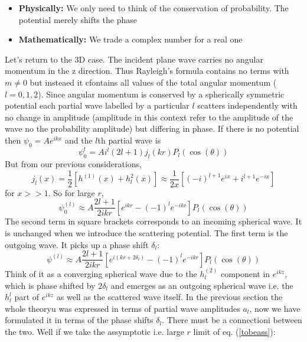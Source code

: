 \begin{itemize}
\item \textbf{Physically:} We only need to think of the conservation of probability. The potential merely shifts the phase
\item \textbf{Mathematically:} We trade a complex number for a real one
\end{itemize}
Let's return to the 3D  case. The incident plane wave carries no angular momentum in the z direction. Thus Rayleigh's formula contains no terms with $m \neq 0$ but insteaed it cfontains all values of the total angular momentum ($l = 0, 1, 2$). Since angular momentum is conserved by a spherically symmetric potential each partial wave labelled by a particular $l$ scatters independently with no change in amplitude (amplitude in this context refer to the amplitude of the wave no the probability amplitude) but differing in phase. If there is no potential then $\psi_{0} = A e^{ikx}$ and the $l$th partial wave is
\begin{equation}
\psi^{l}_{0} = A i^{l} (2l +1) j_{l}(kr)P_{l}(\cos(\theta))
\end{equation}
But from our previous considerations,
\begin{equation}
j_{l}(x) = \frac{1}{2} \left[h^{(1)}(x) + h^{2}_{l}(x) \right] \approx \frac{1}{2x} \left[(-i)^{l+1} e^{ix} + i^{l+1}e^{-ix} \right]
\end{equation}
for $x >>1$. So for large $r$,
\begin{equation}
\psi^{(l)}_{0} \approx A \frac{2l + 1}{2ikr} \left[e^{ikr} - {(-1)}^{l}e^{-ikr}\right] P_{l}(\cos(\theta))
\end{equation}
The second term in square brackets corresponds to an incoming spherical wave. It is unchanged when we introduce the scattering potential. The first term is the outgoing wave. It picks up a phase shift $\delta_{l}$:
\begin{equation}
	\label{tobeass}
\psi^{(l)} \approx A \frac{2l + 1}{2ikr} \left[e^{i(kr + 2\delta_{l})} - {(-1)}^{l}e^{-ikr}\right] P_{l}(\cos(\theta))
\end{equation}
Think of it as a converging spherical wave due to the $h^{(2)}_{l}$ component in $e^{ikz}$, which is phase shifted by $2\delta_{l}$ and emerges as an outgoing spherical wave i.e. the $h^{l}_{l}$ part of $e^{ikz}$ as well  as the scattered wave itself. In the previous section the whole theoryu was expressed in terms of partial wave amplitudes $a_{l}$, now we have formulated it in terms of the phase shifts $\delta_{l}$. There must be a connectioni between the two. Well if we take the assymptotic i.e. large $r$ limit of eq. (\ref{tobeass}):
